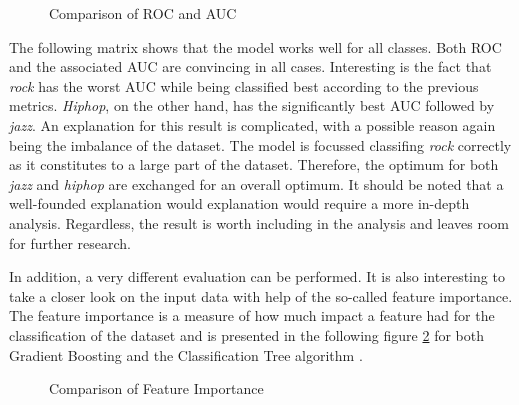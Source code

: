 
  \begin{figure}[H]
    \centering
    \qquad
    \caption{Comparison of ROC and AUC}%
    \label{fig:roc_and_auc_for_gb_and_dt}%
\end{figure}

The following matrix shows that the model works well for all classes. Both \ac{ROC} and the associated \ac{AUC} are convincing 
in all cases. Interesting is the fact that \emph{rock} has the worst \ac{AUC} while being classified best according to the previous metrics.
\emph{Hiphop}, on the other hand, has the significantly best \ac{AUC} followed by \emph{jazz}. An explanation for this result is complicated, with a 
possible reason again being the imbalance of the dataset. The model is focussed classifing \emph{rock} correctly as it constitutes to a large part of the 
dataset. Therefore, the optimum for both \emph{jazz} and \emph{hiphop} are exchanged for an overall optimum. It should be noted that a well-founded explanation would 
explanation would require a more in-depth analysis. Regardless, the result is worth including in the analysis and leaves room for 
further research.   

In addition, a very different evaluation can be performed. It is also interesting to take a closer look on the input data with help of 
the so-called feature importance. The feature importance is a measure of how much impact a feature had for the classification of the 
dataset and is presented in the following figure \ref{fig:feature_inportance_for_gb_and_dt} for both Gradient Boosting and the Classification Tree algorithm
\cite{scikit-learn_feature_importance}. 

\begin{figure}[H]
  \centering
  \qquad
  \caption{Comparison of Feature Importance}%
  \label{fig:feature_inportance_for_gb_and_dt}%
\end{figure}


